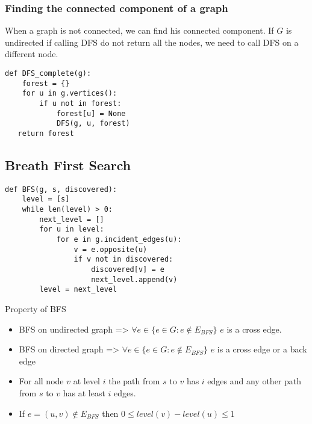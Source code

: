 \documentclass[10pt]{article}
\begin{document}
\subsubsection{Finding the connected component of a graph}
When a graph is not connected, we can find his connected component. If $G$ is undirected if calling DFS do not return all the nodes, we need to call DFS on a different node.

\begin{verbatim}
def DFS_complete(g):
    forest = {}
    for u in g.vertices():
        if u not in forest:
            forest[u] = None
            DFS(g, u, forest)
   return forest
\end{verbatim}

\subsection{Breath First Search}
\begin{verbatim}
def BFS(g, s, discovered):
    level = [s]
    while len(level) > 0:
        next_level = []
        for u in level:
            for e in g.incident_edges(u):
                v = e.opposite(u)
                if v not in discovered:
                    discovered[v] = e 
                    next_level.append(v)
        level = next_level 
\end{verbatim}

Property of BFS
\begin{itemize}
	\item BFS on undirected graph => $\forall e \in \{ e \in G : e\notin E_{BFS}\}$ $e$ is a cross edge.
	\item BFS on directed graph => $\forall e \in \{ e \in G : e\notin E_{BFS}\}$ $e$ is a cross edge or a back edge
	\item For all node $v$ at level $i$ the path from $s$ to $v$ has $i$ edges and any other path from $s$ to $v$ has at least $i$ edges.
	\item If $e=(u, v)\notin E_{BFS}$ then $0 \leq level(v)-level(u) \leq 1$
\end{itemize}
\end{document}
